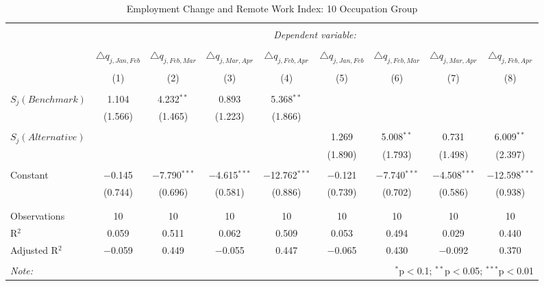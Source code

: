 
\begin{table}[!htbp] \centering 
  \caption{Employment Change and Remote Work Index: 10 Occupation Group} 
  \label{tab:regression_dynamics_10oc} 
\footnotesize 
\begin{tabular}{@{\extracolsep{5pt}}lcccccccc} 
\\[-1.8ex]\hline 
\hline \\[-1.8ex] 
 & \multicolumn{8}{c}{\textit{Dependent variable:}} \\ 
\cline{2-9} 
\\[-1.8ex] & $\triangle q_{j,Jan,Feb}$ & $\triangle q_{j,Feb,Mar}$ & $\triangle q_{j,Mar,Apr}$ & $\triangle q_{j,Feb,Apr}$ & $\triangle q_{j,Jan,Feb}$ & $\triangle q_{j,Feb,Mar}$ & $\triangle q_{j,Mar,Apr}$ & $\triangle q_{j,Feb,Apr}$ \\ 
\\[-1.8ex] & (1) & (2) & (3) & (4) & (5) & (6) & (7) & (8)\\ 
\hline \\[-1.8ex] 
 $S_{j}(Benchmark)$ & 1.104 & 4.232$^{**}$ & 0.893 & 5.368$^{**}$ &  &  &  &  \\ 
  & (1.566) & (1.465) & (1.223) & (1.866) &  &  &  &  \\ 
  & & & & & & & & \\ 
 $S_{j}(Alternative)$ &  &  &  &  & 1.269 & 5.008$^{**}$ & 0.731 & 6.009$^{**}$ \\ 
  &  &  &  &  & (1.890) & (1.793) & (1.498) & (2.397) \\ 
  & & & & & & & & \\ 
 Constant & $-$0.145 & $-$7.790$^{***}$ & $-$4.615$^{***}$ & $-$12.762$^{***}$ & $-$0.121 & $-$7.740$^{***}$ & $-$4.508$^{***}$ & $-$12.598$^{***}$ \\ 
  & (0.744) & (0.696) & (0.581) & (0.886) & (0.739) & (0.702) & (0.586) & (0.938) \\ 
  & & & & & & & & \\ 
\hline \\[-1.8ex] 
Observations & 10 & 10 & 10 & 10 & 10 & 10 & 10 & 10 \\ 
R$^{2}$ & 0.059 & 0.511 & 0.062 & 0.509 & 0.053 & 0.494 & 0.029 & 0.440 \\ 
Adjusted R$^{2}$ & $-$0.059 & 0.449 & $-$0.055 & 0.447 & $-$0.065 & 0.430 & $-$0.092 & 0.370 \\ 
\hline 
\hline \\[-1.8ex] 
\textit{Note:}  & \multicolumn{8}{r}{$^{*}$p$<$0.1; $^{**}$p$<$0.05; $^{***}$p$<$0.01} \\ 
\end{tabular} 
\end{table} 
